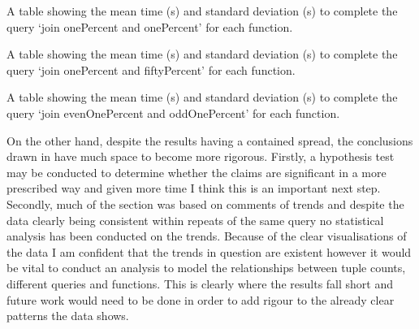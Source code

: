 \begin{table}[h]
\centering

\caption{A table showing the mean time (s) and standard deviation (s) to complete the query `join onePercent and onePercent' for each function.}
\label{tab:evaluation:std-dev-comparison-onePercent-onePercent}
\end{table}

\begin{table}[h]
\centering

\caption{A table showing the mean time (s) and standard deviation (s) to
complete the query `join onePercent and fiftyPercent' for each function.}
\label{tab:evaluation:std-dev-comparison-onePercent-fiftyPercent}
\end{table}

\begin{table}[h]
\centering

\caption{A table showing the mean time (s) and standard deviation (s) to
complete the query `join evenOnePercent and oddOnePercent' for each function.}
\label{tab:evaluation:std-dev-comparison-evenOnePercent-oddOnePercent}
\end{table}

On the other hand, despite the results having a contained spread, the
conclusions drawn in  have much space to become more
rigorous. Firstly, a hypothesis test may be conducted to determine whether the
claims are significant in a more prescribed way and given more time I think this
is an important next step. Secondly, much of the section was based on comments
of trends and despite the data clearly being consistent within repeats of the
same query no statistical analysis has been conducted on the trends. Because of
the clear visualisations of the data I am confident that the trends in question
are existent however it would be vital to conduct an analysis to model the
relationships between tuple counts, different queries and functions. This is
clearly where the results fall short and future work would need to be done in
order to add rigour to the already clear patterns the data shows.

